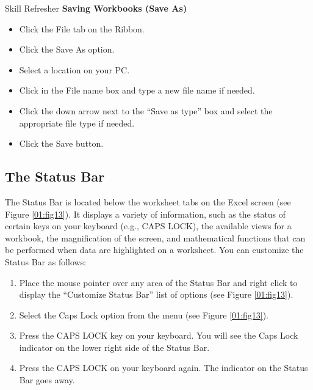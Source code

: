 \begin{center}
	\begin{sklbox}{Skill Refresher}
		\textbf{Saving Workbooks (Save As)}
		\\
		\begin{itemize}
			\setlength{\itemsep}{0pt}
			\setlength{\parskip}{0pt}
			\setlength{\parsep}{0pt}
			
			\item Click the File tab on the Ribbon.
			\item Click the Save As option.
			\item Select a location on your PC.
			\item Click in the File name box and type a new file name if needed.
			\item Click the down arrow next to the ``Save as type'' box and select the appropriate file type if needed.
			\item Click the Save button.
		
		\end{itemize}
	\end{sklbox}
\end{center}

\subsection{The Status Bar}

The Status Bar is located below the worksheet tabs on the Excel screen (see Figure \ref{01:fig13}). It displays a variety of information, such as the status of certain keys on your keyboard (e.g., CAPS LOCK), the available views for a workbook, the magnification of the screen, and mathematical functions that can be performed when data are highlighted on a worksheet. You can customize the Status Bar as follows:

\begin{enumerate}
	\item Place the mouse pointer over any area of the Status Bar and right click to display the ``Customize Status Bar'' list of options (see Figure \ref{01:fig13}).
	\item Select the Caps Lock option from the menu (see Figure \ref{01:fig13}).
	\item Press the CAPS LOCK key on your keyboard. You will see the Caps Lock indicator on the lower right side of the Status Bar.
	\item Press the CAPS LOCK on your keyboard again. The indicator on the Status Bar goes away.
\end{enumerate}

